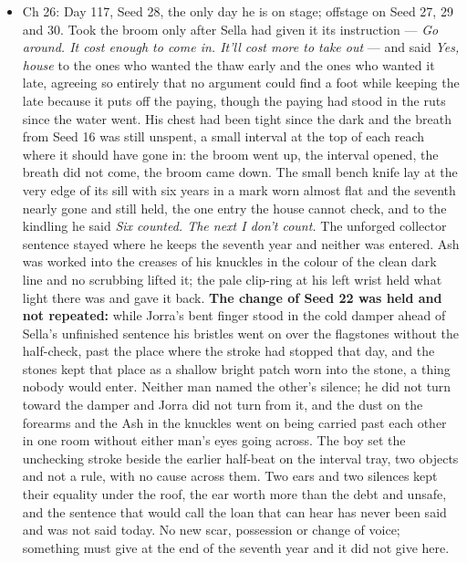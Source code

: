 \documentclass{design/chronicle}
\begin{document}
{\begin{itemize}[leftmargin=1.4em,itemsep=1pt,topsep=3pt,parsep=0pt]
\item Ch 26: Day 117, Seed 28, the only day he is on stage; offstage on Seed 27, 29 and 30. Took the broom only after Sella had given it its instruction — \emph{Go around. It cost enough to come in. It’ll cost more to take out} — and said \emph{Yes, house} to the ones who wanted the thaw early and the ones who wanted it late, agreeing so entirely that no argument could find a foot while keeping the late because it puts off the paying, though the paying had stood in the ruts since the water went. His chest had been tight since the dark and the breath from Seed 16 was still unspent, a small interval at the top of each reach where it should have gone in: the broom went up, the interval opened, the breath did not come, the broom came down. The small bench knife lay at the very edge of its sill with six years in a mark worn almost flat and the seventh nearly gone and still held, the one entry the house cannot check, and to the kindling he said \emph{Six counted. The next I don’t count.} The unforged collector sentence stayed where he keeps the seventh year and neither was entered. Ash was worked into the creases of his knuckles in the colour of the clean dark line and no scrubbing lifted it; the pale clip-ring at his left wrist held what light there was and gave it back. \textbf{The change of Seed 22 was held and not repeated:} while Jorra’s bent finger stood in the cold damper ahead of Sella’s unfinished sentence his bristles went on over the flagstones without the half-check, past the place where the stroke had stopped that day, and the stones kept that place as a shallow bright patch worn into the stone, a thing nobody would enter. Neither man named the other’s silence; he did not turn toward the damper and Jorra did not turn from it, and the dust on the forearms and the Ash in the knuckles went on being carried past each other in one room without either man’s eyes going across. The boy set the unchecking stroke beside the earlier half-beat on the interval tray, two objects and not a rule, with no cause across them. Two ears and two silences kept their equality under the roof, the ear worth more than the debt and unsafe, and the sentence that would call the loan that can hear has never been said and was not said today. No new scar, possession or change of voice; something must give at the end of the seventh year and it did not give here.

\end{itemize}

\begin{itemize}[leftmargin=1.4em,itemsep=1pt,topsep=3pt,parsep=0pt]


\end{itemize}}
\end{document}
